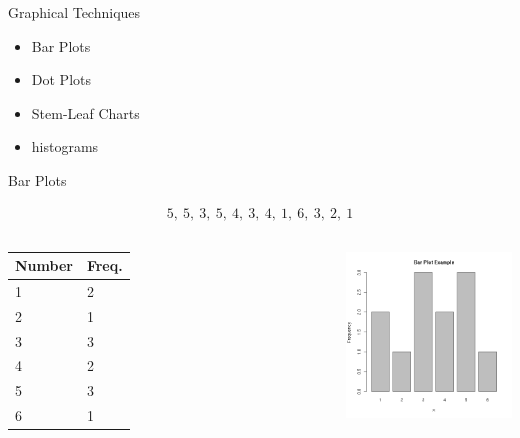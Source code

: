 \begin{frame}{Graphical Techniques}

  \begin{itemize}
  \item Bar Plots
  \item Dot Plots
  \item Stem-Leaf Charts
  \item histograms
  \end{itemize}
  
\end{frame}


\begin{frame}{Bar Plots}

  \begin{eqnarray*}
    5,~5,~3,~5,~4,~3,~4,~1,~6,~3,~2,~1
  \end{eqnarray*}


  \begin{columns}


    \begin{tabular}{l|l}
      Number  & Freq. \\ \hline
      1 & 2 \\
      2 & 1 \\
      3 & 3 \\
      4 & 2 \\
      5 & 3 \\
      6 & 1 
    \end{tabular}


    \includegraphics[width=7cm]{img/barplotExample}


  \end{columns}
  
  
\end{frame}


